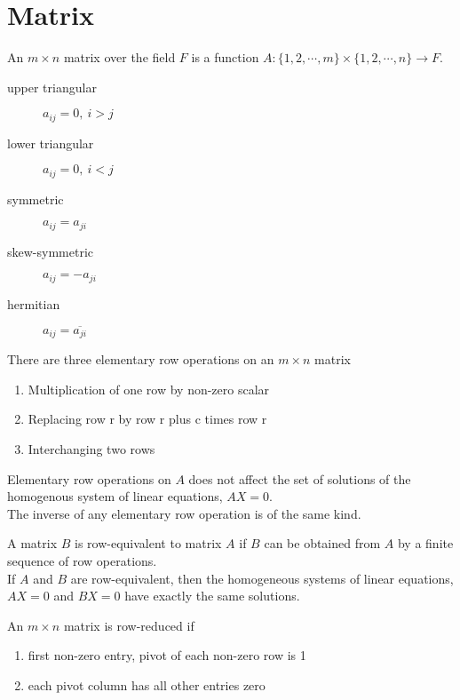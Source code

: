 \section{Matrix}
	\begin{definition}
		An $m \times n$ matrix over the field $F$ is a function $A : \{1,2,\cdots,m\} \times \{1,2,\cdots,n\} \to F$.
	\end{definition}
	\begin{description}
		\item[upper triangular] $a_{ij} = 0,\ i>j$
		\item[lower triangular] $a_{ij} = 0,\ i<j$
		\item[symmetric] $a_{ij} = a_{ji}$
		\item[skew-symmetric] $a_{ij} = -a_{ji}$
		\item[hermitian] $a_{ij} = \overline{a_{ji}}$
	\end{description}
	\begin{remark}
		There are three elementary row operations on an $m \times n$ matrix
		\begin{enumerate}
			\item Multiplication of one row by non-zero scalar
			\item Replacing row r by row r plus c times row r
			\item Interchanging two rows
		\end{enumerate}
	\end{remark}
	\begin{remark}
		Elementary row operations on $A$ does not affect the set of solutions of the homogenous system of linear equations, $AX = 0$.\\
		The inverse of any elementary row operation is of the same kind.
	\end{remark}
	\begin{definition}
		A matrix $B$ is row-equivalent to matrix $A$ if $B$ can be obtained from $A$ by a finite sequence of row operations.\\
		If $A$ and $B$ are row-equivalent, then the homogeneous systems of linear equations, $AX = 0$ and $BX=0$ have exactly the same solutions.
	\end{definition}
	\begin{definition}
		An $m \times n$ matrix is row-reduced if
		\begin{enumerate}
			\item first non-zero entry, pivot of each non-zero row is 1
			\item each pivot column has all other entries zero 
		\end{enumerate}
	\end{definition}
